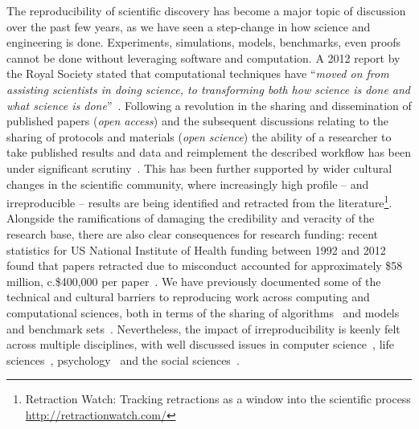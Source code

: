 \documentclass{llncs}
\begin{document}
The reproducibility of scientific discovery has become a major topic
of discussion over the past few years, as we have seen a step-change
in how science and engineering is done. Experiments, simulations,
models, benchmarks, even proofs cannot be done without leveraging
software and computation. A 2012 report by the Royal Society stated
that computational techniques have ``{\emph{moved on from assisting
scientists in doing science, to transforming both how science is done
and what science is done}}''~\cite{rssaaoe:2012}. Following a
revolution in the sharing and dissemination of published papers
(\emph{open access}) and the subsequent discussions relating to the
sharing of protocols and materials (\emph{open science}) the ability
of a researcher to take published results and data and reimplement the
described workflow has been under significant
scrutiny~\cite{stodden-et-al:2013,sandve-et-al:2013,wilson-et-al:2014}. This
has been further supported by wider cultural changes in the scientific
community, where increasingly high profile -- and irreproducible --
results are being identified and retracted from the
literature\footnote{Retraction Watch: Tracking retractions as a window
into the scientific
process\\\url{http://retractionwatch.com/}}. Alongside the
ramifications of damaging the credibility and veracity of the research
base, there are also clear consequences for research funding: recent statistics
for US National Institute of Health funding between 1992 and 2012
found that papers retracted due to misconduct accounted for
approximately \$58 million, c.\$400,000 per
paper~\cite{stern-et-al:2014}. We have previously documented some of
the technical and cultural barriers to reproducing work across
computing and computational sciences, both in terms of the sharing of
algorithms~\cite{crick-et-al_recomp2014} and models and benchmark
sets~\cite{crick-et-al_wssspe2}. Nevertheless, the impact of
irreproducibility is keenly felt across multiple disciplines, with
well discussed issues in computer science~\cite{collberg-et-al:2014},
life sciences~\cite{rollins-et-al:2014},
psychology~\cite{chambers-et-al:2014} and the social
sciences~\cite{conte-et-al:2012}.
\end{document}
